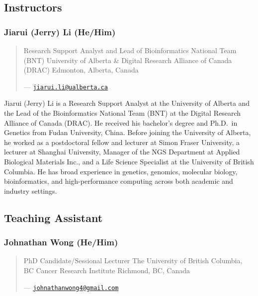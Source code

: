 \documentclass[
]{book}
\begin{document}
\subsection{Instructors}\label{instructors}

\subsubsection{Jiarui (Jerry) Li (He/Him)}\label{jiarui-jerry-li-hehim}

\begin{quote}
Research Support Analyst and Lead of Bioinformatics National Team (BNT)
University of Alberta \& Digital Research Alliance of Canada (DRAC)
Edmonton, Alberta, Canada

--- \href{mailto:jiarui.li@ualberta.ca}{\nolinkurl{jiarui.li@ualberta.ca}}
\end{quote}

Jiarui (Jerry) Li is a Research Support Analyst at the University of Alberta and the Lead of the Bioinformatics National Team (BNT) at the Digital Research Alliance of Canada (DRAC). He received his bachelor's degree and Ph.D.~in Genetics from Fudan University, China. Before joining the University of Alberta, he worked as a postdoctoral fellow and lecturer at Simon Fraser University, a lecturer at Shanghai University, Manager of the NGS Department at Applied Biological Materials Inc., and a Life Science Specialist at the University of British Columbia. He has broad experience in genetics, genomics, molecular biology, bioinformatics, and high-performance computing across both academic and industry settings.

\subsection{Teaching Assistant}\label{teaching-assistant}

\subsubsection{Johnathan Wong (He/Him)}\label{johnathan-wong-hehim}

\begin{quote}
PhD Candidate/Sessional Lecturer
The University of British Columbia, BC Cancer Research Institute
Richmond, BC, Canada

--- \href{mailto:johnathanwong4@gmail.com}{\nolinkurl{johnathanwong4@gmail.com}}
\end{quote}
\end{document}
